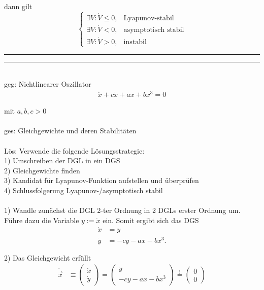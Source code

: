 \documentclass{article}
\begin{document}
	dann gilt
		\begin{equation}
			\begin{cases}
				\exists V: \dot{V} \leq 0, & \text{Lyapunov-stabil} \\
				\exists V: \dot{V} < 0, & \text{asymptotisch stabil} \\
				\exists V: \dot{V} > 0, & \text{instabil}
			\end{cases}
		\end{equation}
\hrule


\newpage


{\color{blue}
\hrule
	\\
	geg: Nichtlinearer Oszillator
		\begin{align*}
			\ddot{x} + c \dot{x} + a x + b x^3 = 0
		\end{align*}
	
	mit $a, b, c > 0$\\
	\\
	ges: Gleichgewichte und deren Stabilitäten \\
	\\
	Lös: Verwende die folgende Lösungsstrategie:\\
	1) Umschreiben der DGL in ein DGS \\
	2) Gleichgewichte finden \\
	3) Kandidat für Lyapunov-Funktion aufstellen und überprüfen\\
	4) Schlussfolgerung Lyapunov-/asymptotisch stabil \\
	\\
	1) Wandle zunächst die DGL 2-ter Ordnung in 2 DGLs erster Ordnung um. Führe dazu die Variable $y := \dot{x}$ ein. Somit ergibt sich das DGS
		\begin{align*}
			\dot{x} &= y \\
			\dot{y} &= - c y - a x - b x^3.
		\end{align*}
	
	2) Das Gleichgewicht erfüllt
		\begin{align*}
			\dot{\vec{x}} &\equiv
			\begin{pmatrix}
				\dot{x} \\
				\dot{y}
			\end{pmatrix}
			=
			\begin{pmatrix}
				y \\
				- c y - a x - b x^3
			\end{pmatrix}
			\stackrel{!}{=}
			\begin{pmatrix}
				0 \\
				0
			\end{pmatrix}
		\end{align*}

}
\end{document}
